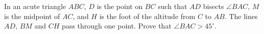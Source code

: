 In an acute triangle $ABC$, $D$ is the point on $BC$ such that $AD$ bisects $\angle BAC$, $M$ is the midpoint of $AC$, and $H$ is the foot of the altitude from $C$ to $AB$. The lines $AD$, $BM$ and $CH$ pass through one point. Prove that $\angle BAC>45^\circ$.
